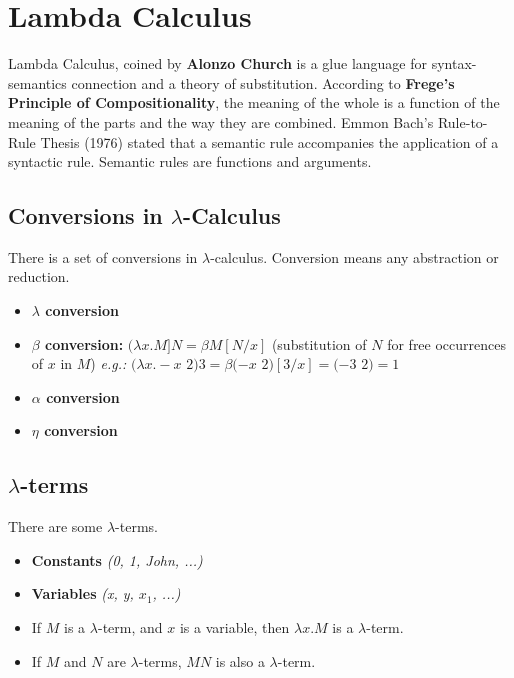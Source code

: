 \documentclass[12pt,a4paper]{article}
\begin{document}
{

\clearpage

\section{Lambda Calculus}
Lambda Calculus, coined by \textbf{Alonzo Church} is a glue language for syntax-semantics connection and a theory of substitution. According to \textbf{Frege's Principle of Compositionality}, the meaning of the whole is a function of the meaning of the parts and the way they are combined. Emmon Bach's Rule-to-Rule Thesis (1976) stated that a semantic rule accompanies the application of a syntactic rule. Semantic rules are functions and arguments.


\subsection{Conversions in $\lambda$-Calculus}
There is a set of conversions in $\lambda$-calculus. Conversion means any abstraction or reduction.

\begin{itemize}
\item \textbf{$\lambda$ conversion}
\item \textbf{$\beta$ conversion:} $(\lambda x.M]N=\beta M[N/x]$ (substitution of $N$ for free occurrences of $x$ in $M$)\emph{ e.g.:} $(\lambda x.-x$ $2)3=\beta (-x$ $2)[3/x]=(-3$ $2)=1$
\item \textbf{$\alpha$ conversion}
\item \textbf{$\eta$ conversion}
\end{itemize}

\subsection{$\lambda$-terms}
There are some $\lambda$-terms.

\begin{itemize}
\item \textbf{Constants} \textit{(0, 1, John, ...)}
\item \textbf{Variables} \textit{(x, y, $x_1$, ...)}
\item If $M$ is a $\lambda$-term, and $x$ is a variable, then $\lambda x.M$ is a $\lambda$-term.
\item If $M$ and $N$ are $\lambda$-terms, $MN$ is also a $\lambda$-term.
\end{itemize} 

}
\end{document}
